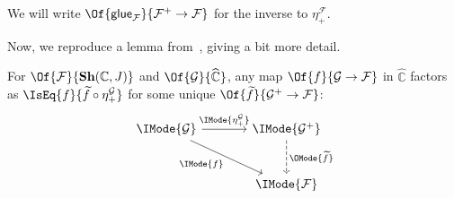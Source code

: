 \documentclass{article}
\newcommand\Psh[1]{\widehat{#1}}
\newcommand\Sh[1]{\mathbf{Sh} (#1)}
\newcommand\Plus[1]{{#1}^+}
\begin{document}
\begin{notation}
  We will write
  $\Of{\Glue{\mathcal{F}}}{\Plus{\mathcal{F}}\to\mathcal{F}}$ for the
  inverse to $\eta_+^{\mathcal{F}}$.
\end{notation}

Now, we reproduce a lemma from~\cite{maclane-moerdijk:1992}, giving a
bit more detail.
\begin{lem}
  For $\Of{\mathcal{F}}{\Sh{\mathbb{C},J}}$ and
  $\Of{\mathcal{G}}{\Psh{\mathbb{C}}}$, any map
  $\Of{f}{\mathcal{G}\to\mathcal{F}}$ in $\Psh{\mathbb{C}}$ factors as
  $\IsEq{f}{\widetilde{f}\circ\eta_+^{\mathcal{G}}}$ for some unique
  $\Of{\widetilde{f}}{\Plus{\mathcal{G}}\to\mathcal{F}}$:
  \begin{equation}\label{diagram:plus-f-tilde}
    \begin{tikzcd}[sep=large]
      \IMode{\mathcal{G}}
      \arrow[r,"\IMode{\eta_+^\mathcal{G}}"]
      \arrow[dr,swap,"\IMode{f}"]
      &
      \IMode{\Plus{\mathcal{G}}}
      \arrow[d,dashed,"\OMode{\widetilde{f}}"]
      \\
      &
      \IMode{\mathcal{F}}
    \end{tikzcd}
  \end{equation}
\end{lem}
\end{document}
